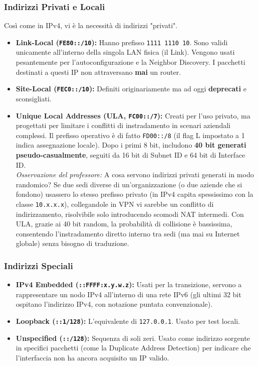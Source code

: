 \subsubsection{Indirizzi Privati e Locali}
Così come in IPv4, vi è la necessità di indirizzi "privati".
\begin{itemize}
    \item \textbf{Link-Local (\texttt{FE80::/10}):} Hanno prefisso \texttt{1111 1110 10}. Sono validi unicamente all'interno della singola LAN fisica (il Link). Vengono usati pesantemente per l'autoconfigurazione e la Neighbor Discovery. I pacchetti destinati a questi IP non attraversano \textbf{mai} un router.
    \item \textbf{Site-Local (\texttt{FEC0::/10}):} Definiti originariamente ma ad oggi \textbf{deprecati} e sconsigliati.
    \item \textbf{Unique Local Addresses (ULA, \texttt{FC00::/7}):} Creati per l'uso privato, ma progettati per limitare i conflitti di instradamento in scenari aziendali complessi. Il prefisso operativo è di fatto \texttt{FD00::/8} (il flag L impostato a 1 indica assegnazione locale). Dopo i primi 8 bit, includono \textbf{40 bit generati pseudo-casualmente}, seguiti da 16 bit di Subnet ID e 64 bit di Interface ID. 
    \\ \textit{Osservazione del professore:} A cosa servono indirizzi privati generati in modo randomico? Se due sedi diverse di un'organizzazione (o due aziende che si fondono) usassero lo stesso prefisso privato (in IPv4 capita spessissimo con la classe \texttt{10.x.x.x}), collegandole in VPN vi sarebbe un conflitto di indirizzamento, risolvibile solo introducendo scomodi NAT intermedi. Con ULA, grazie ai 40 bit random, la probabilità di collisione è bassissima, consentendo l'instradamento diretto interno tra sedi (ma mai su Internet globale) senza bisogno di traduzione.
\end{itemize}

\subsubsection{Indirizzi Speciali}
\begin{itemize}
    \item \textbf{IPv4 Embedded (\texttt{::FFFF:x.y.w.z}):} Usati per la transizione, servono a rappresentare un nodo IPv4 all'interno di una rete IPv6 (gli ultimi 32 bit ospitano l'indirizzo IPv4, con notazione puntata convenzionale).
    \item \textbf{Loopback (\texttt{::1/128}):} L'equivalente di \texttt{127.0.0.1}. Usato per test locali.
    \item \textbf{Unspecified (\texttt{::/128}):} Sequenza di soli zeri. Usato come indirizzo sorgente in specifici pacchetti (come la Duplicate Address Detection) per indicare che l'interfaccia non ha ancora acquisito un IP valido.
\end{itemize}

